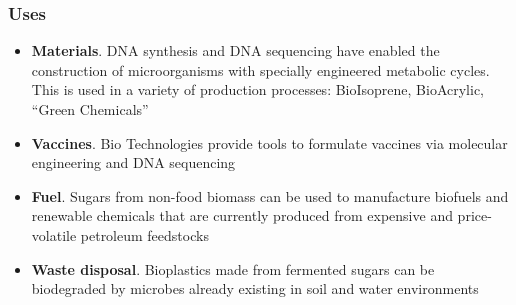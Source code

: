 \documentclass{beamer}
\begin{document}
\begin{frame}
	\frametitle{Uses}
	
	\begin{itemize}
		\item \textbf{Materials}.  DNA synthesis and DNA sequencing have enabled the construction of microorganisms with specially engineered metabolic cycles. This is used in a variety of production processes: BioIsoprene, BioAcrylic, ``Green Chemicals''
		\item \textbf{Vaccines}. Bio Technologies provide tools to formulate vaccines via molecular engineering and DNA sequencing
		\item \textbf{Fuel}. Sugars from non-food biomass can be used to manufacture biofuels and renewable chemicals that are currently produced from expensive and price-volatile petroleum feedstocks
		\item \textbf{Waste disposal}. Bioplastics made from fermented sugars can be biodegraded by microbes already existing in soil and water environments
	\end{itemize}
\end{frame}
\end{document}
